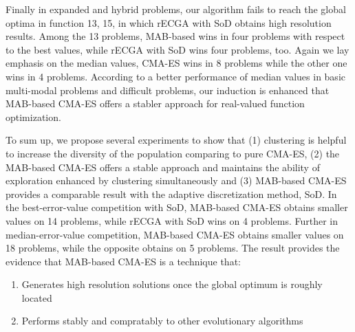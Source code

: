 Finally in expanded and hybrid problems, our algorithm fails to reach
the global optima in function 13, 15, in which rECGA with SoD obtains
high resolution results.
Among the 13 problems, MAB-based wins in four problems with respect to
the best values, while rECGA with SoD wins four problems, too.
Again we lay emphasis on the median values, CMA-ES wins in 8 problems
while the other one wins in 4 problems.
According to a better performance of median values in basic multi-modal
problems and difficult problems, our induction is enhanced that
MAB-based CMA-ES offers a stabler approach for real-valued function
optimization.

To sum up, we propose several experiments to show that (1) clustering is
helpful to increase the diversity of the population comparing to pure
CMA-ES, (2) the MAB-based CMA-ES offers a stable approach and maintains
the ability of exploration enhanced by clustering simultaneously and
(3) MAB-based CMA-ES provides a comparable result with the adaptive
discretization method, SoD.
In the best-error-value competition with SoD, MAB-based CMA-ES obtains
smaller values on 14 problems, while rECGA with SoD wins on 4
problems.
Further in median-error-value competition, MAB-based CMA-ES obtains
smaller values on 18 problems, while the opposite obtains on 5 problems.
The result provides the evidence that MAB-based CMA-ES is a technique
that:
\begin{enumerate}
\item{Generates high resolution solutions once the global optimum is
  roughly located}
\item{Performs stably and compratably to other evolutionary algorithms}
  \end{enumerate}


